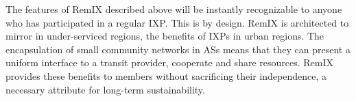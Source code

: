 

The features of RemIX described above will be instantly recognizable to anyone
who has participated in a regular \ac{IXP}. This is by design. RemIX is
architected to mirror in under-serviced regions, the benefits of \acp{IXP} in
urban regions. The encapsulation of small community networks in \acp{AS} means
that they can present a uniform interface to a transit provider, cooperate and
share resources. RemIX provides these benefits to members without sacrificing
their independence, a necessary attribute for long-term sustainability.
%

